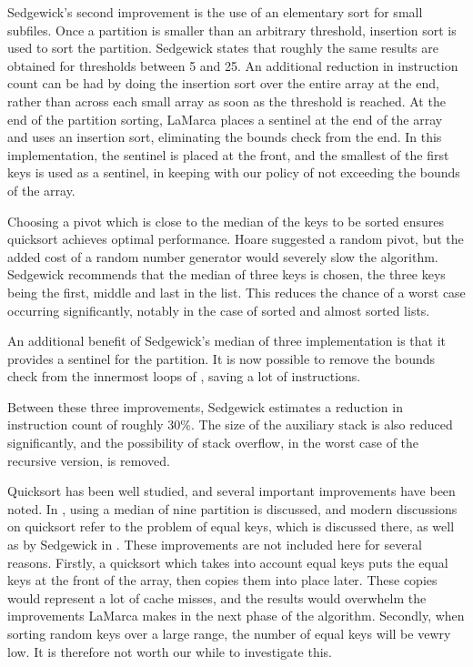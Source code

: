 Sedgewick's second improvement is the use of an elementary sort for small
subfiles.  Once a partition is smaller than an arbitrary threshold, insertion
sort is used to sort the partition. Sedgewick states that roughly the same
results are obtained for thresholds between 5 and 25. An additional reduction in
instruction count can be had by doing the insertion sort over the entire array
at the end, rather than across each small array as soon as the threshold is
reached. At the end of the partition sorting, LaMarca places a sentinel at the
end of the array and uses an insertion sort, eliminating the bounds check from
the end. In this implementation, the sentinel is placed at the front, and the
smallest of the first  keys is used as a sentinel, in keeping
with our policy of not exceeding the bounds of the array.

Choosing a pivot which is close to the median of the keys to be sorted ensures
quicksort achieves optimal performance. Hoare suggested a random pivot, but the
added cost of a random number generator would severely slow the algorithm.
Sedgewick recommends that the median of three keys is chosen, the three keys
being the first, middle and last in the list. This reduces the chance of a worst
case occurring significantly, notably in the case of sorted and almost sorted
lists.

An additional benefit of Sedgewick's median of three implementation is that it
provides a sentinel for the partition. It is now possible to remove the bounds
check from the innermost loops of , saving a lot of instructions.

Between these three improvements, Sedgewick estimates a reduction in
instruction count of roughly 30\%. The size of the auxiliary stack is also
reduced significantly, and the possibility of stack overflow, in the worst case
of the recursive version, is removed.

Quicksort has been well studied, and several important improvements have been
noted. In \cite{BentleyMcIlroy93}, using a median of nine partition is discussed,
and modern discussions on quicksort refer to the problem of equal keys, which is
discussed there, as well as by Sedgewick in \cite{SedgewickBentley02}. These
improvements are not included here for several reasons. Firstly, a quicksort
which takes into account equal keys puts the equal keys at the front of the
array, then copies them into place later. These copies would represent a lot of
cache misses, and the results would overwhelm the improvements LaMarca makes in
the next phase of the algorithm. Secondly, when sorting random keys over a
large range, the number of equal keys will be vewry low. It is therefore not
worth our while to investigate this.

